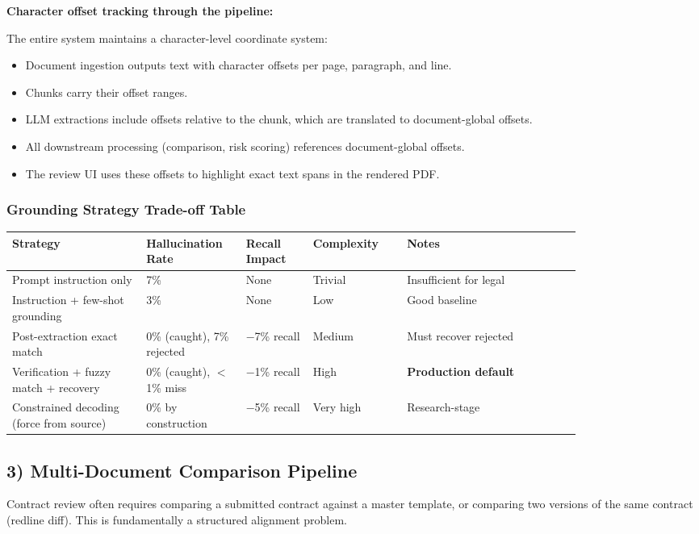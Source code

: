 \textbf{Character offset tracking through the pipeline:}

The entire system maintains a character-level coordinate system:
\begin{itemize}
  \item Document ingestion outputs text with character offsets per page, paragraph, and line.
  \item Chunks carry their offset ranges.
  \item LLM extractions include offsets relative to the chunk, which are translated to document-global offsets.
  \item All downstream processing (comparison, risk scoring) references document-global offsets.
  \item The review UI uses these offsets to highlight exact text spans in the rendered PDF.
\end{itemize}

\subsubsection*{Grounding Strategy Trade-off Table}

\begin{tabular}{|p{0.20\linewidth}|p{0.12\linewidth}|p{0.10\linewidth}|p{0.14\linewidth}|p{0.26\linewidth}|}
\hline
\textbf{Strategy} & \textbf{Hallucination Rate} & \textbf{Recall Impact} & \textbf{Complexity} & \textbf{Notes} \\
\hline
Prompt instruction only & 7\% & None & Trivial & Insufficient for legal \\
\hline
Instruction + few-shot grounding & 3\% & None & Low & Good baseline \\
\hline
Post-extraction exact match & 0\% (caught), 7\% rejected & $-$7\% recall & Medium & Must recover rejected \\
\hline
Verification + fuzzy match + recovery & 0\% (caught), $<$1\% miss & $-$1\% recall & High & \textbf{Production default} \\
\hline
Constrained decoding (force from source) & 0\% by construction & $-$5\% recall & Very high & Research-stage \\
\hline
\end{tabular}

\subsection*{3) Multi-Document Comparison Pipeline}

Contract review often requires comparing a submitted contract against a master template, or comparing two versions of the same contract (redline diff). This is fundamentally a structured alignment problem.

